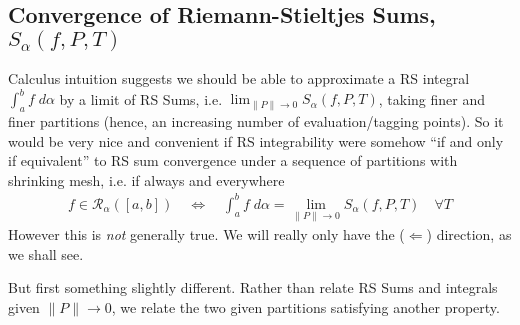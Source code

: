 \documentclass[12pt]{article}
\numberwithin{equation}{section} %
\theoremstyle{plain}
\theoremstyle{definition}
\theoremstyle{remark}
\newcommand{\ra}{\rightarrow}
\newcommand{\sR}{\mathscr{R}}
\begin{document}
\newpage
\subsection{Convergence of Riemann-Stieltjes Sums, $S_\alpha(f,P,T)$}

Calculus intuition suggests we should be able to approximate a RS
integral $\int^b_af\; d\alpha$ by a limit of RS Sums, i.e.
$\lim_{\lVert P\rVert\ra 0} S_\alpha(f,P,T)$,
taking finer and finer partitions (hence, an increasing number of
evaluation/tagging points). So it would be very nice and convenient if
RS integrability were somehow ``if and only if equivalent'' to RS sum
convergence under a sequence of partitions with shrinking mesh, i.e.
if always and everywhere
\begin{align*}
  f\in\sR_\alpha([a,b])
  \quad\iff\quad
  \int^b_a f\; d\alpha = \lim_{\lVert P \rVert\ra 0} S_\alpha(f,P,T)
  \quad \forall T
\end{align*}
However this is \emph{not} generally true. We will really only have
the ($\Leftarrow$) direction, as we shall see.

But first something slightly different.
Rather than relate RS Sums and integrals given $\lVert P\rVert\ra 0$,
we relate the two given partitions satisfying another property.
\end{document}
